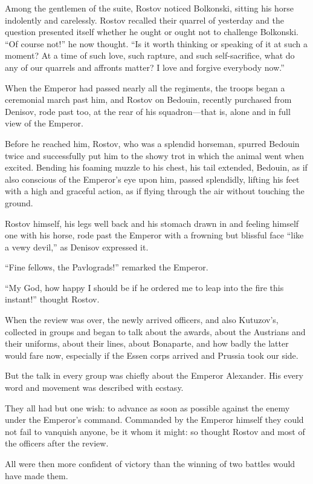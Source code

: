 Among the gentlemen of the suite, Rostov noticed Bolkonski,
sitting his horse indolently and carelessly. Rostov recalled
their quarrel of yesterday and the question presented itself
whether he ought or ought not to challenge Bolkonski. ``Of course
not!'' he now thought. ``Is it worth thinking or speaking of it
at such a moment? At a time of such love, such rapture, and such
self-sacrifice, what do any of our quarrels and affronts matter?
I love and forgive everybody now.''

When the Emperor had passed nearly all the regiments, the troops
began a ceremonial march past him, and Rostov on Bedouin,
recently purchased from Denisov, rode past too, at the rear of
his squadron---that is, alone and in full view of the Emperor.

Before he reached him, Rostov, who was a splendid horseman,
spurred Bedouin twice and successfully put him to the showy trot
in which the animal went when excited. Bending his foaming muzzle
to his chest, his tail extended, Bedouin, as if also conscious of
the Emperor's eye upon him, passed splendidly, lifting his feet
with a high and graceful action, as if flying through the air
without touching the ground.

Rostov himself, his legs well back and his stomach drawn in and
feeling himself one with his horse, rode past the Emperor with a
frowning but blissful face ``like a vewy devil,'' as Denisov
expressed it.

``Fine fellows, the Pavlograds!'' remarked the Emperor.

``My God, how happy I should be if he ordered me to leap into the
fire this instant!'' thought Rostov.

When the review was over, the newly arrived officers, and also
Kutuzov's, collected in groups and began to talk about the
awards, about the Austrians and their uniforms, about their
lines, about Bonaparte, and how badly the latter would fare now,
especially if the Essen corps arrived and Prussia took our side.

But the talk in every group was chiefly about the Emperor
Alexander. His every word and movement was described with
ecstasy.

They all had but one wish: to advance as soon as possible against
the enemy under the Emperor's command. Commanded by the Emperor
himself they could not fail to vanquish anyone, be it whom it
might: so thought Rostov and most of the officers after the
review.

All were then more confident of victory than the winning of two
battles would have made them.

